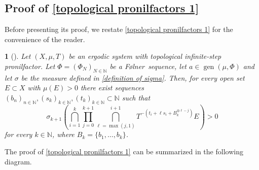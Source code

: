 \documentclass[letter, 11pt]{article}
\makeatletter
\newcommand{\Folner}{F\o{}lner}
\theoremstyle{definition}
\theoremstyle{plain}
\newtheorem*{namedthm}{\namedthmname} %
\newenvironment{named}[2]{%
  \def\namedthmname{#1}%
  \begin{namedthm}[#2]%
  \def\@currentlabelname{#1}%
}{%
  \end{namedthm}%
}
\newcommand{\N}{\mathbb{N}}
\DeclareMathOperator\gen{gen}
\newcommand{\1}{\mathbbm{1}}
\makeatother
\begin{document}
\subsection{Proof of \cref{topological pronilfactors 1}}

Before presenting its proof, we restate \cref{topological pronilfactors 1} for 
the convenience of the reader.

\begin{named}{\cref{topological pronilfactors 1}}{}
Let $(X,\mu,T)$ be an ergodic system with topological infinite-step 
pronilfactor. Let $\Phi=(\Phi_N)_{N\in \N}$ be a \Folner\ sequence, 
let 
$a\in \gen(\mu,\Phi)$ and let $\sigma$ be the measure defined in \cref{definition of sigma}. Then, 
for every open set $E\subset X$ with $\mu(E)>0$ there exist sequences $(b_n)_{n\in \N}, (s_k)_{k\in \N}, (t_k)_{k\in \N}\subset \N$ such 
that 
    \begin{equation}\label{eq-measure-conj-1}
\sigma_{k+1}\left(\bigcap_{i=1}^k  \prod_{j=0}^{k+1}  \bigcap_{\ell=\max(j,1)}^{i+1}  T^{-\left( t_i+\ell s_i+ B_k^{\oplus \ell-j} \right)}  E   \right)>0
    \end{equation}
for every $k\in \N$, where $B_k=\{b_1,\ldots,b_{k}\}$.  
\end{named}

The proof of \cref{topological pronilfactors 1} can be summarized in the following diagram.
\end{document}

